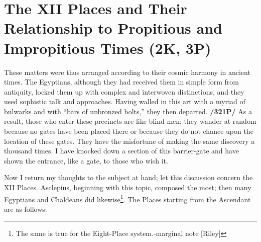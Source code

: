 \section{The XII Places and Their Relationship to Propitious and Impropitious Times (2K, 3P)}

These matters were thus arranged according to their cosmic harmony in ancient times. The Egyptians, although they had received them in simple form from antiquity, locked them up with complex and interwoven distinctions, and they used sophistic talk and approaches. 
Having walled in this art with a myriad of bulwarks and with “bars of unbronzed bolts,” they then departed. \textbf{/321P/} As a result, those who enter these precincts are like blind men: they wander at random because no gates have been placed there or because they do not chance upon the location of these gates. They have the misfortune of making the same discovery a thousand times. I have knocked down a section of this barrier-gate and have shown the entrance, like a gate, to those who wish it. 

Now I return my thoughts to the subject at hand; let this discussion concern the XII Places. Asclepius, beginning with this topic, composed the most; then many Egyptians and Chaldeans did likewise\footnote{The same is true for the Eight-Place system.-marginal note [Riley]}.
The Places starting from the Ascendant are as follows:

